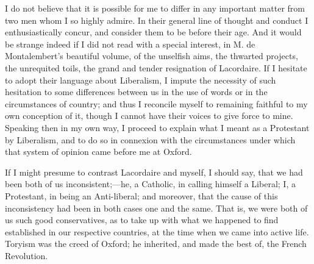 I do not believe that it is possible for me to differ in any
important matter from two men whom I so highly admire. In their general
line of thought and conduct I enthusiastically concur, and consider them
to be before their age. And it would be strange indeed if I did not read
with a special interest, in M. de Montalembert's beautiful volume, of
the unselfish aims, the thwarted projects, the unrequited toils, the
grand and tender resignation of Lacordaire. If I hesitate to adopt their
language about Liberalism, I impute the necessity of such hesitation to
some differences between us in the use of words or in the circumstances
of country; and thus I reconcile myself to remaining faithful to my own
conception of it, though I cannot have their voices to give force to
mine. Speaking then in my own way, I proceed to explain what I meant as
a Protestant by Liberalism, and to do so in connexion with the
circumstances under which that system of opinion came before me at
Oxford.

If I might presume to contrast Lacordaire and myself, I should say,
that we had been both of us inconsistent;—he, a Catholic, in calling
himself a Liberal; I, a Protestant, in being an Anti-liberal; and
moreover, that the cause of this inconsistency had been in both cases
one and the same. That is, we were both of us such good conservatives,
as to take up with what we happened to find established in our
respective countries, at the time when we came into active life. Toryism
was the creed of Oxford; he inherited, and made the best of, the French
Revolution.

